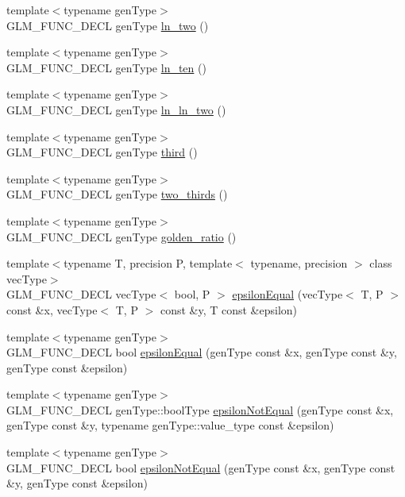 \begin{CompactItemize}
\item 
{\footnotesize template$<$typename genType$>$ }\\GLM\_\-FUNC\_\-DECL genType \hyperlink{group__gtc__constants_g1d237e2d94b69cdf1122ae8cbb561b2d}{ln\_\-two} ()
\item 
{\footnotesize template$<$typename genType$>$ }\\GLM\_\-FUNC\_\-DECL genType \hyperlink{group__gtc__constants_g8b4f9e44073d823e00294592d295d0f1}{ln\_\-ten} ()
\item 
{\footnotesize template$<$typename genType$>$ }\\GLM\_\-FUNC\_\-DECL genType \hyperlink{group__gtc__constants_g938ac709f33297c1324ca30866f3d9a5}{ln\_\-ln\_\-two} ()
\item 
{\footnotesize template$<$typename genType$>$ }\\GLM\_\-FUNC\_\-DECL genType \hyperlink{group__gtc__constants_ge45f6bc38af321ae365cf702a527c574}{third} ()
\item 
{\footnotesize template$<$typename genType$>$ }\\GLM\_\-FUNC\_\-DECL genType \hyperlink{group__gtc__constants_g846874e34295fed917708f134f754ae4}{two\_\-thirds} ()
\item 
{\footnotesize template$<$typename genType$>$ }\\GLM\_\-FUNC\_\-DECL genType \hyperlink{group__gtc__constants_g8a045109452784d20481cd2ac053c4e0}{golden\_\-ratio} ()
\item 
{\footnotesize template$<$typename T, precision P, template$<$ typename, precision $>$ class vecType$>$ }\\GLM\_\-FUNC\_\-DECL vecType$<$ bool, P $>$ \hyperlink{group__gtc__epsilon_g7051ff93341ffb11d864e88d4bc0e3d8}{epsilonEqual} (vecType$<$ T, P $>$ const \&x, vecType$<$ T, P $>$ const \&y, T const \&epsilon)
\item 
{\footnotesize template$<$typename genType$>$ }\\GLM\_\-FUNC\_\-DECL bool \hyperlink{group__gtc__epsilon_g98e0b3362c11f76fc16f5fa9b27435d8}{epsilonEqual} (genType const \&x, genType const \&y, genType const \&epsilon)
\item 
{\footnotesize template$<$typename genType$>$ }\\GLM\_\-FUNC\_\-DECL genType::boolType \hyperlink{group__gtc__epsilon_g3958ccc0b5aa101c4b6eea41a2f2d51a}{epsilonNotEqual} (genType const \&x, genType const \&y, typename genType::value\_\-type const \&epsilon)
\item 
{\footnotesize template$<$typename genType$>$ }\\GLM\_\-FUNC\_\-DECL bool \hyperlink{group__gtc__epsilon_gcdfcf5e1180e8147b0619c0743e3eb7d}{epsilonNotEqual} (genType const \&x, genType const \&y, genType const \&epsilon)

\end{CompactItemize}
